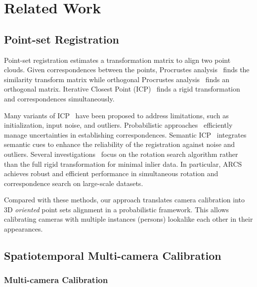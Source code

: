 \section{Related Work}
\subsection{Point-set Registration} 

Point-set registration estimates a transformation matrix to align two point clouds. Given correspondences between the points, Procrustes analysis~\cite{gower1975generalized} finds the similarity transform matrix while orthogonal Procrustes analysis~\cite{Schnemann1966AGS} finds an orthogonal matrix. Iterative Closest Point (ICP)~\cite{besl1992method} finds a rigid transformation and correspondences simultaneously.


Many variants of ICP~\cite{myronenko2010point,segal2009generalized} have been proposed to address limitations, such as initialization, input noise, and outliers.
Probabilistic approaches~\cite{myronenko2010point,Parkison2018SemanticIC} efficiently manage uncertainties in establishing correspondences. Semantic ICP~\cite{Parkison2018SemanticIC} integrates semantic cues to enhance the reliability of the registration against noise and outliers. Several investigations~\cite{Peng2022ARCSAR,yang2019quaternion} focus on the rotation search algorithm rather than the full rigid transformation for minimal inlier data. In particular, ARCS~\cite{Peng2022ARCSAR} achieves robust and efficient performance in simultaneous rotation and correspondence search on large-scale datasets.



Compared with these methods, our approach translates camera calibration into 3D \textit{oriented} point sets alignment in a probabilistic framework.
%
This allows calibrating cameras with multiple instances (\eg persons) lookalike each other in their appearances.


\subsection{Spatiotemporal Multi-camera Calibration}

\subsubsection{Multi-camera Calibration} 

